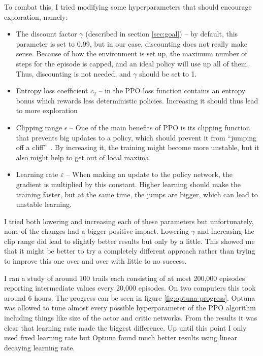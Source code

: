 \documentclass[
  digital,     %
  oneside,     %
  nosansbold,  %
  nocolorbold, %
  lof,         %
  lot,         %
]{fithesis4}
\begin{document}
To combat this, I tried modifying some hyperparameters that should encourage exploration, namely:
\begin{itemize}
    \item The discount factor $\gamma$ (described in section \ref{sec:goal}) -- by default, this parameter is set to 0.99, but in our case, discounting does not really make sense. Because of how the environment is set up, the maximum number of steps for the episode is capped, and an ideal policy will use up all of them. Thus, discounting is not needed, and $\gamma$ should be set to 1.
    \item Entropy loss coefficient $c_2$ -- in the PPO loss function contains an entropy bonus which rewards less deterministic policies. Increasing it should thus lead to more exploration~\cite{PPO_paper}
    \item Clipping range $\epsilon$ -- One of the main benefits of PPO is its clipping function that prevents big updates to a policy, which should prevent it from \enquote{jumping off a cliff}~\cite{PPO_paper}. By increasing it, the training might become more unstable, but it also might help to get out of local maxima.
    \item Learning rate $\varepsilon$ -- When making an update to the policy network, the gradient is multiplied by this constant. Higher learning should make the training faster, but at the same time, the jumps are bigger, which can lead to unstable learning.
\end{itemize}

I tried both lowering and increasing each of these parameters but unfortunately, none of the changes had a bigger positive impact. Lowering $\gamma$ and increasing the clip range did lead to slightly better results but only by a little. This showed me that it might be better to try a completely different approach rather than trying to improve this one over and over with little to no success.

I ran a study of around 100 trails each consisting of at most 200,000 episodes reporting intermediate values every 20,000 episodes. On two computers this took around 6 hours. The progress can be seen in figure \ref{fig:optuna-progress}. Optuna was allowed to tune almost every possible hyperparameter of the PPO algorithm including things like size of the actor and critic networks. From the results it was clear that learning rate made the biggest difference. Up until this point I only used fixed learning rate but Optuna found much better results using linear decaying learning rate.
\end{document}
